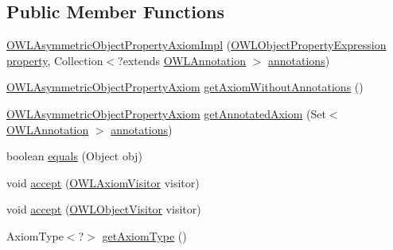 \subsection*{Public Member Functions}
\begin{DoxyCompactItemize}
\item 
\hyperlink{classuk_1_1ac_1_1manchester_1_1cs_1_1owl_1_1owlapi_1_1_o_w_l_asymmetric_object_property_axiom_impl_aa828b6e0e52aa0d61ee136b5d8e3fc8b}{O\-W\-L\-Asymmetric\-Object\-Property\-Axiom\-Impl} (\hyperlink{interfaceorg_1_1semanticweb_1_1owlapi_1_1model_1_1_o_w_l_object_property_expression}{O\-W\-L\-Object\-Property\-Expression} \hyperlink{classuk_1_1ac_1_1manchester_1_1cs_1_1owl_1_1owlapi_1_1_o_w_l_object_property_characteristic_axiom_impl_ac99438140edc10b050c93559f367cdbb}{property}, Collection$<$?extends \hyperlink{interfaceorg_1_1semanticweb_1_1owlapi_1_1model_1_1_o_w_l_annotation}{O\-W\-L\-Annotation} $>$ \hyperlink{classuk_1_1ac_1_1manchester_1_1cs_1_1owl_1_1owlapi_1_1_o_w_l_axiom_impl_af6fbf6188f7bdcdc6bef5766feed695e}{annotations})
\item 
\hyperlink{interfaceorg_1_1semanticweb_1_1owlapi_1_1model_1_1_o_w_l_asymmetric_object_property_axiom}{O\-W\-L\-Asymmetric\-Object\-Property\-Axiom} \hyperlink{classuk_1_1ac_1_1manchester_1_1cs_1_1owl_1_1owlapi_1_1_o_w_l_asymmetric_object_property_axiom_impl_ac261556f1a896ee86e190ddb6469d920}{get\-Axiom\-Without\-Annotations} ()
\item 
\hyperlink{interfaceorg_1_1semanticweb_1_1owlapi_1_1model_1_1_o_w_l_asymmetric_object_property_axiom}{O\-W\-L\-Asymmetric\-Object\-Property\-Axiom} \hyperlink{classuk_1_1ac_1_1manchester_1_1cs_1_1owl_1_1owlapi_1_1_o_w_l_asymmetric_object_property_axiom_impl_adf127ba1b8b9cce5ab10464fbe30a308}{get\-Annotated\-Axiom} (Set$<$ \hyperlink{interfaceorg_1_1semanticweb_1_1owlapi_1_1model_1_1_o_w_l_annotation}{O\-W\-L\-Annotation} $>$ \hyperlink{classuk_1_1ac_1_1manchester_1_1cs_1_1owl_1_1owlapi_1_1_o_w_l_axiom_impl_af6fbf6188f7bdcdc6bef5766feed695e}{annotations})
\item 
boolean \hyperlink{classuk_1_1ac_1_1manchester_1_1cs_1_1owl_1_1owlapi_1_1_o_w_l_asymmetric_object_property_axiom_impl_a42c03cd2fc7bb2f9fa17199ceb272bc1}{equals} (Object obj)
\item 
void \hyperlink{classuk_1_1ac_1_1manchester_1_1cs_1_1owl_1_1owlapi_1_1_o_w_l_asymmetric_object_property_axiom_impl_ac54a5e916047afed706ad8296d749789}{accept} (\hyperlink{interfaceorg_1_1semanticweb_1_1owlapi_1_1model_1_1_o_w_l_axiom_visitor}{O\-W\-L\-Axiom\-Visitor} visitor)
\item 
void \hyperlink{classuk_1_1ac_1_1manchester_1_1cs_1_1owl_1_1owlapi_1_1_o_w_l_asymmetric_object_property_axiom_impl_a22898f2f43acb1ccf2f2e77893d5f1f7}{accept} (\hyperlink{interfaceorg_1_1semanticweb_1_1owlapi_1_1model_1_1_o_w_l_object_visitor}{O\-W\-L\-Object\-Visitor} visitor)
\item 
Axiom\-Type$<$?$>$ \hyperlink{classuk_1_1ac_1_1manchester_1_1cs_1_1owl_1_1owlapi_1_1_o_w_l_asymmetric_object_property_axiom_impl_aaf7a487d9452c88d805f1926080215f9}{get\-Axiom\-Type} ()
\end{DoxyCompactItemize}
